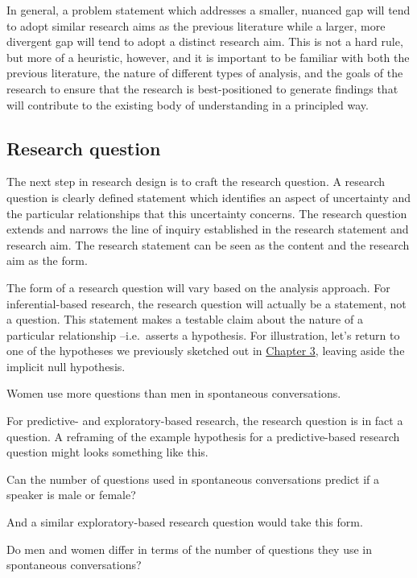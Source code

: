 \documentclass[
  letterpaper,
]{scrbook}
\begin{document}
In general, a problem statement which addresses a smaller, nuanced gap
will tend to adopt similar research aims as the previous literature
while a larger, more divergent gap will tend to adopt a distinct
research aim. This is not a hard rule, but more of a heuristic, however,
and it is important to be familiar with both the previous literature,
the nature of different types of analysis, and the goals of the research
to ensure that the research is best-positioned to generate findings that
will contribute to the existing body of understanding in a principled
way.

\hypertarget{research-question}{%
\subsection{Research question}\label{research-question}}

The next step in research design is to craft the research question. A
research question is clearly defined statement which identifies an
aspect of uncertainty and the particular relationships that this
uncertainty concerns. The research question extends and narrows the line
of inquiry established in the research statement and research aim. The
research statement can be seen as the content and the research aim as
the form.

The form of a research question will vary based on the analysis
approach. For inferential-based research, the research question will
actually be a statement, not a question. This statement makes a testable
claim about the nature of a particular relationship --i.e.~asserts a
hypothesis. For illustration, let's return to one of the hypotheses we
previously sketched out in
\protect\hyperlink{sec-approaching-analysis}{Chapter 3}, leaving aside
the implicit null hypothesis.

Women use more questions than men in spontaneous conversations.

For predictive- and exploratory-based research, the research question is
in fact a question. A reframing of the example hypothesis for a
predictive-based research question might looks something like this.

Can the number of questions used in spontaneous conversations predict if
a speaker is male or female?

And a similar exploratory-based research question would take this form.

Do men and women differ in terms of the number of questions they use in
spontaneous conversations?
\end{document}
